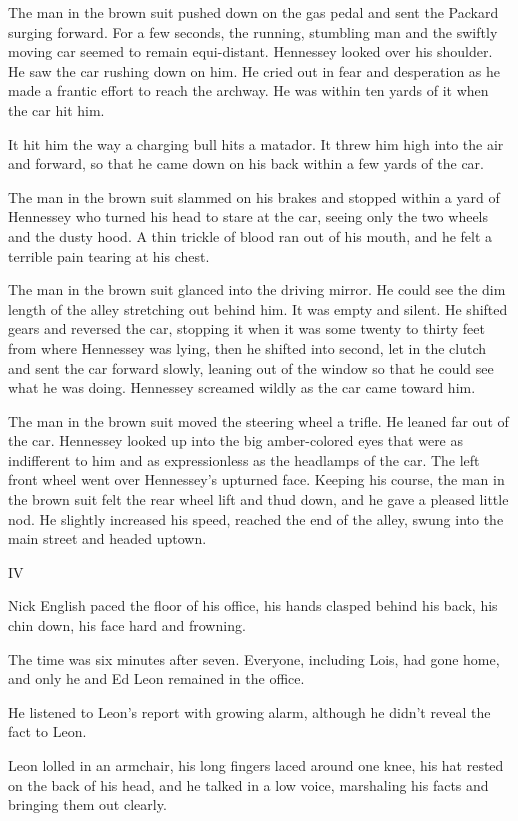 \documentclass{novel}
\begin{document}
The man in the brown suit pushed down on the gas pedal and sent the Packard surging forward. For a few seconds, the running, stumbling man and the swiftly moving car seemed to remain equi-distant. Hennessey looked over his shoulder. He saw the car rushing down on him. He cried out in fear and desperation as he made a frantic effort to reach the archway. He was within ten yards of it when the car hit him.

It hit him the way a charging bull hits a matador. It threw him high into the air and forward, so that he came down on his back within a few yards of the car.

The man in the brown suit slammed on his brakes and stopped within a yard of Hennessey who turned his head to stare at the car, seeing only the two wheels and the dusty hood. A thin trickle of blood ran out of his mouth, and he felt a terrible pain tearing at his chest.

The man in the brown suit glanced into the driving mirror. He could see the dim length of the alley stretching out behind him. It was empty and silent. He shifted gears and reversed the car, stopping it when it was some twenty to thirty feet from where Hennessey was lying, then he shifted into second, let in the clutch and sent the car forward slowly, leaning out of the window so that he could see what he was doing. Hennessey screamed wildly as the car came toward him.

The man in the brown suit moved the steering wheel a trifle. He leaned far out of the car. Hennessey looked up into the big amber-colored eyes that were as indifferent to him and as expressionless as the headlamps of the car. The left front wheel went over Hennessey's upturned face. Keeping his course, the man in the brown suit felt the rear wheel lift and thud down, and he gave a pleased little nod. He slightly increased his speed, reached the end of the alley, swung into the main street and headed uptown.



IV

Nick English paced the floor of his office, his hands clasped behind his back, his chin down, his face hard and frowning.

The time was six minutes after seven. Everyone, including Lois, had gone home, and only he and Ed Leon remained in the office.

He listened to Leon's report with growing alarm, although he didn't reveal the fact to Leon.

Leon lolled in an armchair, his long fingers laced around one knee, his hat rested on the back of his head, and he talked in a low voice, marshaling his facts and bringing them out clearly.
\end{document}
